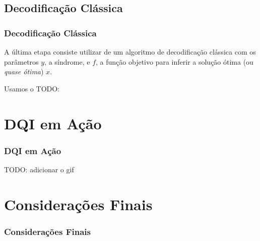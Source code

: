 \documentclass[aspectratio=169]{beamer}
\begin{document}
\subsection{Decodificação Clássica}
\begin{frame}
  \frametitle{Decodificação Clássica}

  A última etapa consiste utilizar de um algoritmo de decodificação clássica com os parâmetros $y$, a síndrome, e $f$, a função objetivo para inferir a solução ótima (ou \textit{quase ótima}) $x$.

  \vfill

  Usamos o TODO:

\end{frame}

\section{DQI em Ação}
\begin{frame}
  \frametitle{DQI em Ação}

  TODO: adicionar o gif
  
\end{frame}

\section{Considerações Finais}
\begin{frame}
  \frametitle{Considerações Finais}
  
\end{frame}
\end{document}
